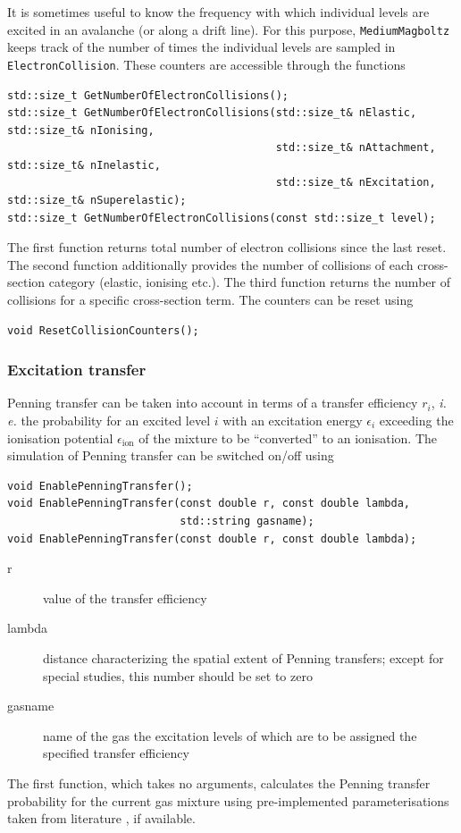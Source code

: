 It is sometimes useful to know the frequency with which individual levels 
are excited in an avalanche (or along a drift line). 
For this purpose, \texttt{MediumMagboltz} keeps track of the number of times 
the individual levels are sampled in \texttt{ElectronCollision}. 
These counters are accessible through the functions
\begin{lstlisting}
std::size_t GetNumberOfElectronCollisions();
std::size_t GetNumberOfElectronCollisions(std::size_t& nElastic, std::size_t& nIonising, 
                                          std::size_t& nAttachment, std::size_t& nInelastic, 
                                          std::size_t& nExcitation, std::size_t& nSuperelastic);
std::size_t GetNumberOfElectronCollisions(const std::size_t level);
\end{lstlisting}
The first function returns total number of electron collisions 
since the last reset. 
The second function additionally provides the number of collisions of each 
cross-section category (elastic, ionising etc.). 
The third function returns the number of collisions for a specific cross-section term.
The counters can be reset using
\begin{lstlisting}
void ResetCollisionCounters();
\end{lstlisting} 

\subsubsection{Excitation transfer}\label{Sec:PenningTransfer}

Penning transfer can be taken into account in terms of a transfer efficiency 
\(r_{i}\), \textit{i.\,e.} the probability for an excited level \(i\) with an  
excitation energy \(\epsilon_{i}\) exceeding the ionisation potential 
\(\epsilon_{\text{ion}}\) of the mixture to 
be ``converted'' to an ionisation.
The simulation of Penning transfer can be switched on/off using
\begin{lstlisting}
void EnablePenningTransfer();
void EnablePenningTransfer(const double r, const double lambda, 
                           std::string gasname);
void EnablePenningTransfer(const double r, const double lambda);
\end{lstlisting}
\begin{description}
  \item[r] value of the transfer efficiency
  \item[lambda] distance characterizing the spatial extent of Penning transfers; 
                except for special studies, this number should be set to zero
  \item[gasname] name of the gas the excitation levels of which are to be assigned 
                 the specified transfer efficiency 
\end{description}
The first function, which takes no arguments, 
calculates the Penning transfer probability for the current gas mixture
using pre-implemented parameterisations taken from literature 
\cite{Sahin2010,Sahin2017,Sahin2018,Sahin2021}, if available. 

